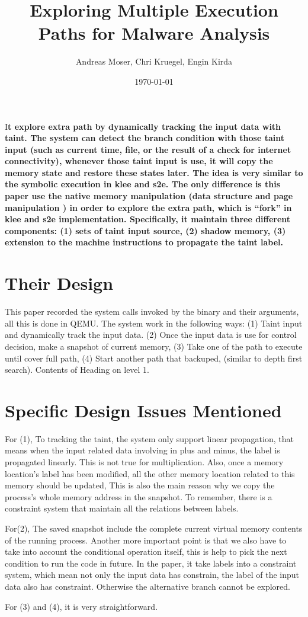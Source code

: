 \documentclass[	DIV=calc, paper=letter, fontsize=11pt,twocolumn]{scrartcl} %
\title{Exploring Multiple Execution Paths for Malware Analysis}	%
\author{Andreas Moser, Chri Kruegel, Engin Kirda} %
\date{\today}
\newcommand{\initial}[1]{%
     \lettrine[lines=3,lhang=0.2,nindent=0em]{
     				\color{DarkGoldenrod}
     				{\textsf{#1}}}{}}
\begin{document}
\maketitle
\thispagestyle{fancy} 			%
\initial{I}\textbf{t explore extra path by dynamically tracking the input
data with taint. The system can detect the branch condition with those taint
input (such as current time, file, or the result of a check for internet
connectivity), whenever those taint input is use, it will copy the memory
state and restore these states later. The idea is very similar to the symbolic
execution in klee and s2e. The only difference is this paper use the native
memory manipulation (data structure and page manipulation ) in order to
explore the extra path, which is “fork” in klee and s2e implementation.
Specifically, it maintain three different components: (1) sets of taint input
source, (2) shadow memory, (3) extension to the machine instructions to
propagate the taint label. }

\section*{Their Design}

This paper recorded the system calls invoked by the binary and their
arguments, all this is done in QEMU. The system work in the following ways:
(1) Taint input and dynamically track the input data. (2) Once the input data
is use for control decision, make a snapshot of current memory, (3) Take one
of the path to execute until cover full path, (4) Start another path that
backuped, (similar to depth first search).  Contents of Heading on level 1.

\section*{Specific Design Issues Mentioned}

For (1), To tracking the taint, the system only support linear propagation,
that means when the input related data involving in plus and minus, the label
is propagated linearly. This is not true for multiplication. Also, once a
memory location’s label has been modified, all the other memory location
related to this memory should be updated, This is also the main reason why we
copy the process’s whole memory address in the snapshot. To remember, there is
a constraint system that maintain all the relations between labels.

For(2), The saved snapshot include the complete current virtual memory
contents of the running process. Another more important point is that we also
have to take into account the conditional operation itself, this is help to
pick the next condition to run the code in future. In the paper, it take
labels into a constraint system, which mean not only the input data has
constrain, the label of the input data also has constraint. Otherwise the
alternative branch cannot be explored.

For (3) and (4), it is very straightforward.
\end{document}

